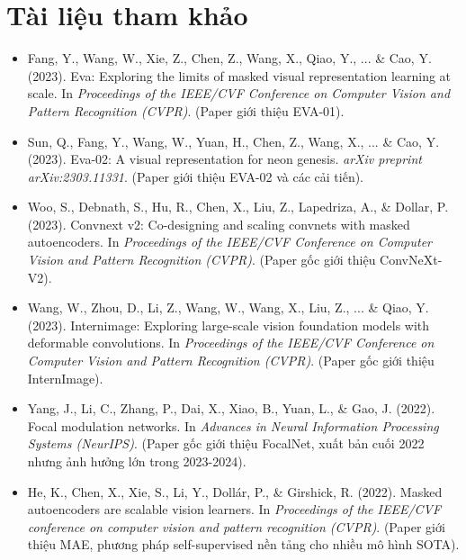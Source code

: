 \section*{Tài liệu tham khảo}
\begin{itemize}
	\item[1] Fang, Y., Wang, W., Xie, Z., Chen, Z., Wang, X., Qiao, Y., ... \& Cao, Y. (2023). Eva: Exploring the limits of masked visual representation learning at scale. In \textit{Proceedings of the IEEE/CVF Conference on Computer Vision and Pattern Recognition (CVPR)}. (Paper giới thiệu EVA-01).
	\item[2] Sun, Q., Fang, Y., Wang, W., Yuan, H., Chen, Z., Wang, X., ... \& Cao, Y. (2023). Eva-02: A visual representation for neon genesis. \textit{arXiv preprint arXiv:2303.11331}. (Paper giới thiệu EVA-02 và các cải tiến).
	\item[3] Woo, S., Debnath, S., Hu, R., Chen, X., Liu, Z., Lapedriza, A., \& Dollar, P. (2023). Convnext v2: Co-designing and scaling convnets with masked autoencoders. In \textit{Proceedings of the IEEE/CVF Conference on Computer Vision and Pattern Recognition (CVPR)}. (Paper gốc giới thiệu ConvNeXt-V2).
	\item[4] Wang, W., Zhou, D., Li, Z., Wang, W., Wang, X., Liu, Z., ... \& Qiao, Y. (2023). Internimage: Exploring large-scale vision foundation models with deformable convolutions. In \textit{Proceedings of the IEEE/CVF Conference on Computer Vision and Pattern Recognition (CVPR)}. (Paper gốc giới thiệu InternImage).
	\item[5] Yang, J., Li, C., Zhang, P., Dai, X., Xiao, B., Yuan, L., \& Gao, J. (2022). Focal modulation networks. In \textit{Advances in Neural Information Processing Systems (NeurIPS)}. (Paper gốc giới thiệu FocalNet, xuất bản cuối 2022 nhưng ảnh hưởng lớn trong 2023-2024).
	\item[6] He, K., Chen, X., Xie, S., Li, Y., Dollár, P., \& Girshick, R. (2022). Masked autoencoders are scalable vision learners. In \textit{Proceedings of the IEEE/CVF conference on computer vision and pattern recognition (CVPR)}. (Paper giới thiệu MAE, phương pháp self-supervised nền tảng cho nhiều mô hình SOTA).
\end{itemize}